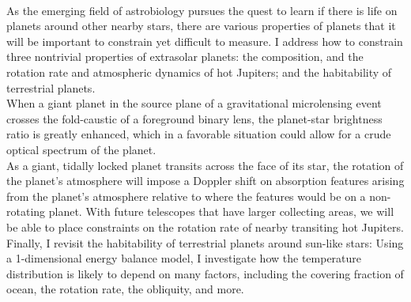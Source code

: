 \\
%
As the emerging field of astrobiology pursues the quest to learn if
there is life on planets around other nearby stars, there are various
properties of planets that it will be important to constrain yet
difficult to measure.  I address how to constrain three nontrivial
properties of extrasolar planets:  the composition, and 
the rotation rate and atmospheric dynamics of hot Jupiters; and
 the habitability of terrestrial planets.\\
%
When a giant planet in the source plane of a gravitational microlensing
event crosses the fold-caustic of a foreground binary lens, the
planet-star brightness ratio is greatly enhanced, which in a favorable
situation could allow for a crude optical spectrum of the planet.\\
%
As a giant, tidally locked planet transits across the face of its
star, the rotation of the planet's atmosphere will impose a Doppler
shift on absorption features arising from the planet's atmosphere
relative to where the features would be on a non-rotating planet. With
future telescopes that have larger collecting areas, we will be able
to place constraints on the rotation rate of nearby transiting hot
Jupiters.\\
%
Finally, I revisit the habitability of terrestrial planets around
sun-like stars: Using a 1-dimensional energy balance model, I
investigate how the temperature distribution is likely to depend on
many factors, including the covering fraction of ocean, the rotation
rate, the obliquity, and more.\\
